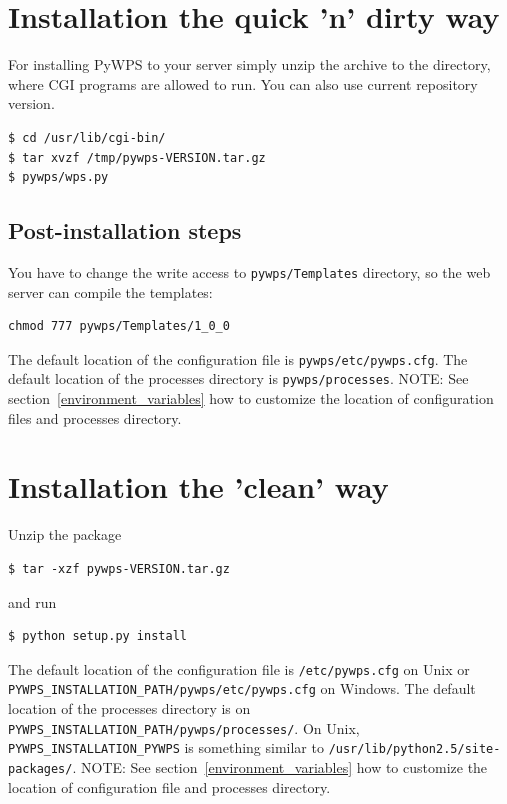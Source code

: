 \documentclass[a4paper,11pt]{report}
\begin{document}
\section{Installation the quick 'n' dirty way}
For installing PyWPS to your server simply unzip the archive to the
directory, where CGI programs are allowed to run. You can also use current
repository version.

\begin{verbatim}
$ cd /usr/lib/cgi-bin/
$ tar xvzf /tmp/pywps-VERSION.tar.gz
$ pywps/wps.py
\end{verbatim}

\subsection{Post-installation steps}
You have to change the write access to \texttt{pywps/Templates} directory,
so the web server can compile the templates:
\begin{verbatim}
chmod 777 pywps/Templates/1_0_0
\end{verbatim}

The default location of the configuration file is
\texttt{pywps/etc/pywps.cfg}. The default location of the processes
directory is \texttt{pywps/processes}. NOTE: See
section~\ref{environment_variables} how to customize the location of
configuration files and processes directory.

\section{Installation the 'clean' way}
Unzip the package 
\begin{verbatim}
$ tar -xzf pywps-VERSION.tar.gz
\end{verbatim}
and run 
\begin{verbatim}
$ python setup.py install
\end{verbatim} 

The default location of the configuration file is
\texttt{/etc/pywps.cfg} on Unix or
\texttt{PYWPS\_INSTALLATION\_PATH/pywps/etc/pywps.cfg} on Windows. The default location of the processes
directory is on \texttt{PYWPS\_INSTALLATION\_PATH/pywps/processes/}. On
Unix, \texttt{PYWPS\_INSTALLATION\_PYWPS} is something similar to
\texttt{/usr/lib/python2.5/site-packages/}.
NOTE: See section~\ref{environment_variables} how to customize the location of
configuration file and processes directory.
\end{document}
